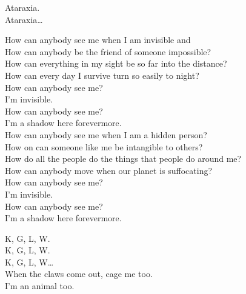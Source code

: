 Ataraxia. \\
Ataraxia… \\




How can anybody see me when I am invisible and \\
How can anybody be the friend of someone impossible? \\
How can everything in my sight be so far into the distance? \\
How can every day I survive turn so easily to night? \\

How can anybody see me? \\
I'm invisible. \\
How can anybody see me? \\
I'm a shadow here forevermore. \\

How can anybody see me when I am a hidden person? \\
How on  can someone like me be intangible to others? \\
How do all the people do the things that people do around me? \\
How can anybody move when our planet is suffocating? \\

How can anybody see me? \\
I'm invisible. \\
How can anybody see me? \\
I'm a shadow here forevermore. \\




K, G, L, W. \\
K, G, L, W. \\
K, G, L, W… \\

When the claws come out, cage me too. \\
I'm an animal too. \\

